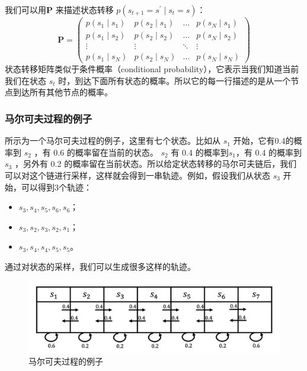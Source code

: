 我们可以用$\boldsymbol{P}$ 来描述状态转移 $p\left(s_{t+1}=s^{\prime} \mid s_{t}=s\right)$：
\begin{equation}
  \boldsymbol{P}=\left(\begin{array}{cccc}
    p\left(s_{1} \mid s_{1}\right) & p\left(s_{2} \mid s_{1}\right) & \ldots & p\left(s_{N} \mid s_{1}\right) \\
    p\left(s_{1} \mid s_{2}\right) & p\left(s_{2} \mid s_{2}\right) & \ldots & p\left(s_{N} \mid s_{2}\right) \\
    \vdots & \vdots & \ddots & \vdots \\
    p\left(s_{1} \mid s_{N}\right) & p\left(s_{2} \mid s_{N}\right) & \ldots & p\left(s_{N} \mid s_{N}\right)
    \end{array}\right)
  \label{eq:1}
\end{equation}
状态转移矩阵类似于条件概率（conditional probability），它表示当我们知道当前我们在状态 $s_t$ 时，到达下面所有状态的概率。所以它的每一行描述的是从一个节点到达所有其他节点的概率。

\subsubsection{马尔可夫过程的例子} 
 所示为一个马尔可夫过程的例子，这里有七个状态。比如从 $s_1$ 开始，它有0.4的概率到 $s_2$ ，有 0.6 的概率留在当前的状态。 $s_2$ 有 0.4 的概率到$s_1$，有 0.4 的概率到 $s_3$ ，另外有 0.2 的概率留在当前状态。所以给定状态转移的马尔可夫链后，我们可以对这个链进行采样，这样就会得到一串轨迹。例如，假设我们从状态 $s_3$ 开始，可以得到3个轨迹：
\begin{itemize}
  \item $s_3, s_4, s_5, s_6, s_6$；
  \item $s_3, s_2, s_3, s_2, s_1$；
  \item $s_3, s_4, s_4, s_5, s_5$。
\end{itemize}
通过对状态的采样，我们可以生成很多这样的轨迹。

\begin{figure}[hbt]
  \centering
  \includegraphics[width=0.5\linewidth]{res/ch2/2.6}
  \caption{马尔可夫过程的例子}
  \label{fig:MP_example}
\end{figure}

